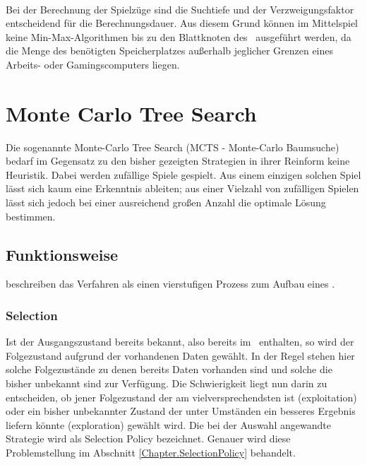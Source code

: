 \\Bei der Berechnung der Spielzüge sind die Suchtiefe und der Verzweigungsfaktor entscheidend für die Berechnungsdauer. Aus diesem Grund können im Mittelspiel keine Min-Max-Algorithmen bis zu den Blattknoten des \gtrees\ ausgeführt werden, da die Menge des benötigten Speicherplatzes außerhalb jeglicher Grenzen eines Arbeits- oder Gamingscomputers liegen.
\section{Monte Carlo Tree Search}
Die sogenannte Monte-Carlo Tree Search (MCTS - Monte-Carlo Baumsuche) bedarf im Gegensatz zu den bisher gezeigten Strategien in ihrer Reinform keine Heuristik. Dabei werden zufällige Spiele gespielt. Aus einem einzigen solchen Spiel lässt sich kaum eine Erkenntnis ableiten; aus einer Vielzahl von zufälligen Spielen lässt sich jedoch bei einer ausreichend großen Anzahl die optimale Lösung bestimmen.
\subsection{Funktionsweise}
\cite{chaslot2008monte} beschreiben das Verfahren als einen vierstufigen Prozess zum Aufbau eines \gtrees .
\subsubsection{Selection}
Ist der Ausgangszustand bereits bekannt, also bereits im \gtree\ enthalten, so wird der Folgezustand aufgrund der vorhandenen Daten gewählt. In der Regel stehen hier solche Folgezustände zu denen bereits Daten vorhanden sind und solche die bisher unbekannt sind zur Verfügung. Die Schwierigkeit liegt nun darin zu entscheiden, ob jener Folgezustand der am vielversprechendsten ist (exploitation) oder ein bisher unbekannter Zustand der unter Umständen ein besseres Ergebnis liefern könnte (exploration) gewählt wird. Die bei der Auswahl angewandte Strategie wird als Selection Policy bezeichnet. Genauer wird diese Problemstellung im Abschnitt \ref{Chapter.SelectionPolicy} behandelt.

